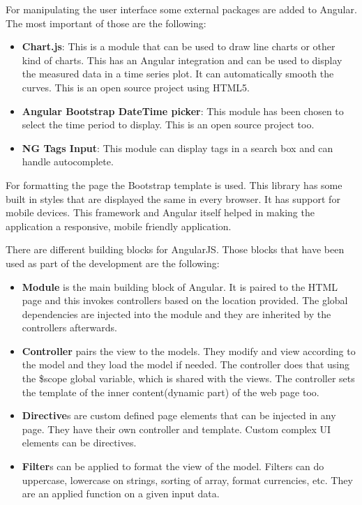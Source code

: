 For manipulating the user interface some external packages are added to Angular. The most important of those are the following:
\begin{itemize}
\item \textbf{Chart.js}: This is a module that can be used to draw line charts or other kind of charts. This has an Angular integration and can be used to display the measured data in a time series plot. It can automatically smooth the curves. This is an open source project using HTML5.
\item \textbf{Angular Bootstrap DateTime picker}: This module has been chosen to select the time period to display. This is an open source project too.
\item \textbf{NG Tags Input}: This module can display tags in a search box and can handle autocomplete. 
\end{itemize}

For formatting the page the Bootstrap template is used. 
This library has some built in styles that are displayed the same in every browser. It has support for mobile devices. This framework and Angular itself helped in making the application a responsive, mobile friendly application.

There are different building blocks for AngularJS. Those blocks that have been used as part of the development are the following:
\begin{itemize}
\item \textbf{Module} is the main building block of Angular. It is paired to the HTML page and this invokes controllers based on the location provided. The global dependencies are injected into the module and they are inherited by the controllers afterwards.
\item \textbf{Controller} pairs the view to the models. They modify and view according to the model and they load the model if needed. The controller does that using the \$scope global variable, which is shared with the views. The controller sets the template of the inner content(dynamic part) of the web page too.
\item \textbf{Directive}s are custom defined page elements that can be injected in any page. They have their own controller and template. Custom complex UI elements can be directives.
\item \textbf{Filter}s can be applied to format the view of the model. Filters can do uppercase, lowercase on strings, sorting of array, format currencies, etc. They are an applied function on a given input data.
\end{itemize}

